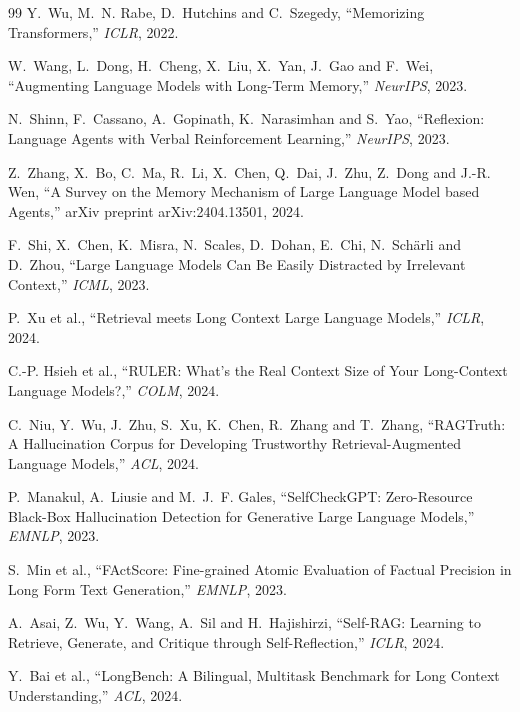 \begin{thebibliography}{99}
 Y.~Wu, M.~N. Rabe, D.~Hutchins and C.~Szegedy, ``Memorizing Transformers,'' \emph{ICLR},
2022.

 W.~Wang, L.~Dong, H.~Cheng, X.~Liu, X.~Yan, J.~Gao and F.~Wei, ``Augmenting Language Models
with Long-Term Memory,'' \emph{NeurIPS}, 2023.

 N.~Shinn, F.~Cassano, A.~Gopinath, K.~Narasimhan and S.~Yao, ``Reflexion: Language Agents
with Verbal Reinforcement Learning,'' \emph{NeurIPS}, 2023.

 Z.~Zhang, X.~Bo, C.~Ma, R.~Li, X.~Chen, Q.~Dai, J.~Zhu, Z.~Dong and J.-R. Wen, ``A Survey
on the Memory Mechanism of Large Language Model based Agents,'' arXiv preprint arXiv:2404.13501, 2024.

 F.~Shi, X.~Chen, K.~Misra, N.~Scales, D.~Dohan, E.~Chi, N.~Sch\"{a}rli and D.~Zhou,
``Large Language Models Can Be Easily Distracted by Irrelevant Context,'' \emph{ICML}, 2023.

 P.~Xu et al., ``Retrieval meets Long Context Large Language Models,''
\emph{ICLR}, 2024.

 C.-P. Hsieh et al., ``RULER: What's the Real Context Size of Your Long-Context Language
Models?,'' \emph{COLM}, 2024.

 C.~Niu, Y.~Wu, J.~Zhu, S.~Xu, K.~Chen, R.~Zhang and T.~Zhang, ``RAGTruth: A Hallucination
Corpus for Developing Trustworthy Retrieval-Augmented Language Models,'' \emph{ACL}, 2024.

 P.~Manakul, A.~Liusie and M.~J.~F. Gales, ``SelfCheckGPT: Zero-Resource Black-Box
Hallucination Detection for Generative Large Language Models,'' \emph{EMNLP}, 2023.

 S.~Min et al., ``FActScore: Fine-grained Atomic Evaluation of Factual Precision in Long
Form Text Generation,'' \emph{EMNLP}, 2023.

 A.~Asai, Z.~Wu, Y.~Wang, A.~Sil and H.~Hajishirzi, ``Self-RAG: Learning to Retrieve,
Generate, and Critique through Self-Reflection,'' \emph{ICLR}, 2024.

 Y.~Bai et al., ``LongBench: A Bilingual, Multitask Benchmark for Long Context
Understanding,'' \emph{ACL}, 2024.

\end{thebibliography}
